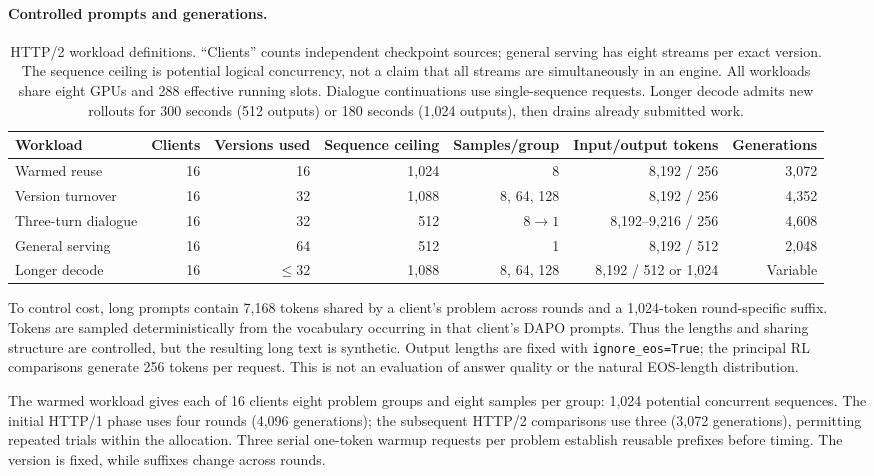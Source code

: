 \paragraph{Controlled prompts and generations.}
\begin{table}[t]\centering\small
\begin{tabular}{lrrrrrr}\toprule
Workload & Clients & Versions used & Sequence ceiling & Samples/group & Input/output tokens & Generations\\\midrule
Warmed reuse & 16 & 16 & 1,024 & 8 & 8,192 / 256 & 3,072\\
Version turnover & 16 & 32 & 1,088 & 8, 64, 128 & 8,192 / 256 & 4,352\\
Three-turn dialogue & 16 & 32 & 512 & $8\rightarrow1$ & 8,192--9,216 / 256 & 4,608\\
General serving & 16 & 64 & 512 & 1 & 8,192 / 512 & 2,048\\
Longer decode & 16 & $\le32$ & 1,088 & 8, 64, 128 & 8,192 / 512 or 1,024 & Variable\\
\bottomrule\end{tabular}
\caption{HTTP/2 workload definitions. ``Clients'' counts independent checkpoint
sources; general serving has eight streams per exact version. The sequence
ceiling is potential logical concurrency, not a claim that all streams are
simultaneously in an engine. All workloads share eight GPUs and 288 effective
running slots. Dialogue continuations use single-sequence requests. Longer
decode admits new rollouts for 300 seconds (512 outputs) or 180 seconds
(1,024 outputs), then drains already submitted work.}
\label{tab:workloads}\end{table}
To control cost, long prompts contain 7,168 tokens shared by a client's problem
across rounds and a 1,024-token round-specific suffix. Tokens are sampled
deterministically from the vocabulary occurring in that client's DAPO prompts.
Thus the lengths and sharing structure are controlled, but the resulting long
text is synthetic. Output lengths are fixed with \texttt{ignore\_eos=True};
the principal RL comparisons generate 256 tokens per request. This is not an
evaluation of answer quality or the natural EOS-length distribution.

The warmed workload gives each of 16 clients eight problem groups and eight
samples per group: 1,024 potential concurrent sequences. The initial HTTP/1
phase uses four rounds (4,096 generations); the subsequent HTTP/2 comparisons
use three (3,072 generations), permitting repeated trials within the allocation.
Three serial one-token warmup requests per problem
establish reusable prefixes before timing. The version is fixed, while suffixes
change across rounds.

